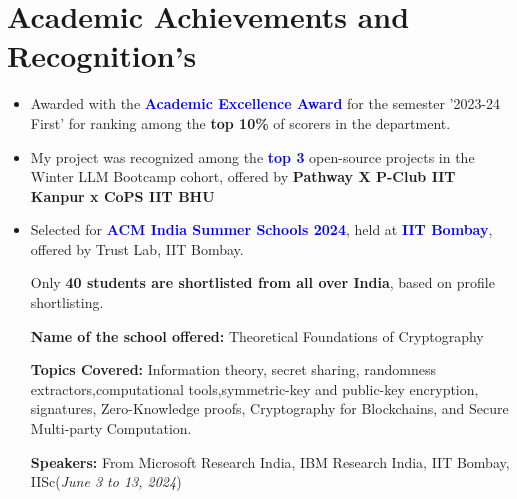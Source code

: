 \documentclass[10.8pt, a4paper]{extarticle}
\newcommand{\shorterSection}[1]{\vspace{-10pt}\section{#1}}
\begin{document}
\shorterSection{Academic Achievements and Recognition's}
\begin{itemize}

 \item Awarded with the \textcolor{blue}{\textbf{Academic Excellence Award}} for the semester '2023-24 First' for ranking among the \textbf{top 10\%} of scorers in the department.\href{https://www.iitk.ac.in/sspc/data/2nd-list-of-Academic-Excellence-Awards-2023-21-03-24.pdf}{\faLink{}}\\[-0.6cm]
 
 
  \item My project was recognized among the \textcolor{blue}{\textbf{top 3 }}open-source projects in the Winter LLM Bootcamp cohort, offered by \textbf{Pathway X P-Club IIT Kanpur x CoPS IIT BHU} \href{https://t.certifier.io/CL0/https:%2F%2Fapi.credsverse.com%2Fv1%2Fusers%2Finvite%2Fceed2b44-26ae-4085-a1c6-291760efed0a/1/0102018ede88dc5e-89a09bd7-6cea-4807-a2c9-3dff747834d9-000000/_U00joiSf7_qp3anDSJNAiO00y7Hxm7ONFmpv6zOP2g=348}{\faLink{}}\\[-0.6cm]


    \item Selected for \textcolor{blue}{\textbf{ACM India Summer Schools 2024}}, held at \textcolor{blue}{\textbf{IIT Bombay}}, offered by Trust Lab, IIT Bombay. \href{https://drive.google.com/file/d/1Zrw9ZEbpcHit9Pn9m18AO0EXmoZq-p33/view?usp=sharing}{\faLink{}}
    
    Only \textbf{40 students are shortlisted from all over India}, based on profile shortlisting. 
    
    \textbf{Name of the school offered:} Theoretical Foundations of Cryptography 
    
    \textbf{Topics Covered:} Information theory, secret sharing, randomness extractors,computational tools,symmetric-key and public-key encryption, signatures, Zero-Knowledge proofs, Cryptography for Blockchains, and Secure Multi-party Computation.
    
    \textbf{Speakers:} From Microsoft Research India, IBM Research India, IIT Bombay, IISc\hfill\hfill(\textit{June 3 to 13, 2024})\\[-0.6cm]



\end{itemize}
\medskip



\end{document}
